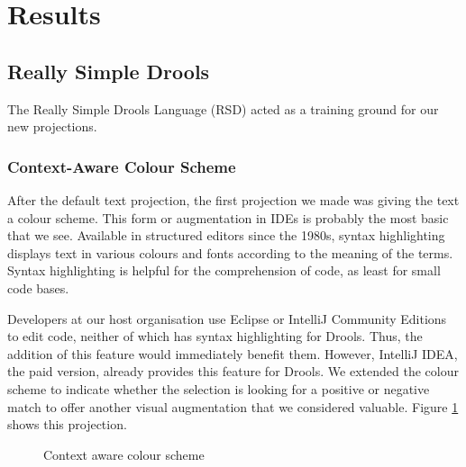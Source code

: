 \section{Results}
\label{section:dsr_results}

\subsection{Really Simple Drools}

The Really Simple Drools Language (RSD) acted as a training ground for our new projections.

\subsubsection{Context-Aware Colour Scheme}
After the default text projection, the first projection we made was giving the text a colour scheme.
This form or augmentation in IDEs is probably the most basic that we see.
Available in structured editors since the 1980s\cite{cowlishaw1987lexx}, syntax highlighting displays text in various colours and fonts according to the meaning of the terms.
Syntax highlighting is helpful for the comprehension of code, as least for small code bases\cite{sarkar2015impact}.

Developers at our host organisation use Eclipse or IntelliJ Community Editions to edit code, neither of which has syntax highlighting for Drools. Thus, the addition of this feature would immediately benefit them.
However, IntelliJ IDEA, the paid version, already provides this feature for Drools.
We extended the colour scheme to indicate whether the selection is looking for a positive or negative match to offer another visual augmentation that we considered valuable.
Figure \ref{fig:colorscheme} shows this projection.

\begin{figure}[h]
    \centering
    \caption{Context aware colour scheme}
    \label{fig:colorscheme}
\end{figure}

